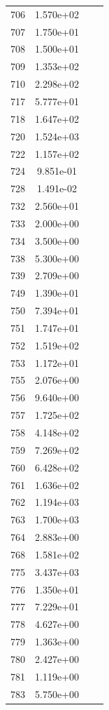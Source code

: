 \documentclass[12pt]{article}
\begin{document}
\begin{longtable}{@{}cccc@{}}
706 & 1.570e+02 &  &  \\
707 & 1.750e+01 &  &  \\
708 & 1.500e+01 &  &  \\
709 & 1.353e+02 &  &  \\
710 & 2.298e+02 &  &  \\
717 & 5.777e+01 &  &  \\
718 & 1.647e+02 &  &  \\
720 & 1.524e+03 &  &  \\
722 & 1.157e+02 &  &  \\
724 & 9.851e-01 &  &  \\
728 & 1.491e-02 &  &  \\
732 & 2.560e+01 &  &  \\
733 & 2.000e+00 &  &  \\
734 & 3.500e+00 &  &  \\
738 & 5.300e+00 &  &  \\
739 & 2.709e+00 &  &  \\
749 & 1.390e+01 &  &  \\
750 & 7.394e+01 &  &  \\
751 & 1.747e+01 &  &  \\
752 & 1.519e+02 &  &  \\
753 & 1.172e+01 &  &  \\
755 & 2.076e+00 &  &  \\
756 & 9.640e+00 &  &  \\
757 & 1.725e+02 &  &  \\
758 & 4.148e+02 &  &  \\
759 & 7.269e+02 &  &  \\
760 & 6.428e+02 &  &  \\
761 & 1.636e+02 &  &  \\
762 & 1.194e+03 &  &  \\
763 & 1.700e+03 &  &  \\
764 & 2.883e+00 &  &  \\
768 & 1.581e+02 &  &  \\
775 & 3.437e+03 &  &  \\
776 & 1.350e+01 &  &  \\
777 & 7.229e+01 &  &  \\
778 & 4.627e+00 &  &  \\
779 & 1.363e+00 &  &  \\
780 & 2.427e+00 &  &  \\
781 & 1.119e+00 &  &  \\
783 & 5.750e+00 &  &  \\

\end{longtable}
\end{document}
